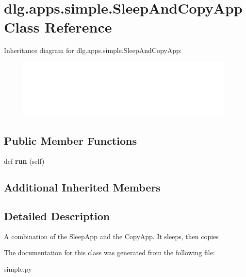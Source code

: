 \hypertarget{classdlg_1_1apps_1_1simple_1_1_sleep_and_copy_app}{}\section{dlg.\+apps.\+simple.\+Sleep\+And\+Copy\+App Class Reference}
\label{classdlg_1_1apps_1_1simple_1_1_sleep_and_copy_app}
Inheritance diagram for dlg.\+apps.\+simple.\+Sleep\+And\+Copy\+App\+:\begin{figure}[H]
\begin{center}
\leavevmode
\includegraphics[height=3.000000cm]{classdlg_1_1apps_1_1simple_1_1_sleep_and_copy_app}
\end{center}
\end{figure}
\subsection*{Public Member Functions}
\begin{DoxyCompactItemize}
\item 
\mbox{\label{classdlg_1_1apps_1_1simple_1_1_sleep_and_copy_app_ada7d6b73bf63ce6eaf6fe23de640d8ac}} 
def {\bfseries run} (self)
\end{DoxyCompactItemize}
\subsection*{Additional Inherited Members}


\subsection{Detailed Description}
\begin{DoxyVerb}A combination of the SleepApp and the CopyApp. It sleeps, then copies\end{DoxyVerb}
 

The documentation for this class was generated from the following file\+:\begin{DoxyCompactItemize}
\item 
simple.\+py\end{DoxyCompactItemize}
